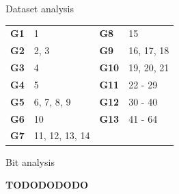 \documentclass{beamer}
\begin{document}
\begin{darkframes}
\begin{frame}{Dataset analysis}
      \begin{table}[!b]
        {\carlitoTLF %
        \begin{tabularx}{\textwidth}{XX|XX}
          \toprule
          \textbf{G1} & 1 & \textbf{G8} & 15 \\
          \textbf{G2} & 2, 3 & \textbf{G9} & 16, 17, 18 \\
          \textbf{G3} & 4 & \textbf{G10} & 19, 20, 21 \\
          \textbf{G4} & 5 & \textbf{G11} & 22 - 29 \\
          \textbf{G5} & 6, 7, 8, 9 & \textbf{G12} & 30 - 40 \\     
          \textbf{G6} & 10 & \textbf{G13} & 41 - 64 \\
          \textbf{G7} & 11, 12, 13, 14 & & \\
          \bottomrule
        \end{tabularx}}
      \end{table}
    \end{frame}

    \begin{frame}{Bit analysis}

     \textbf{TODODODODO}

    \end{frame}


\end{darkframes}
\end{document}
